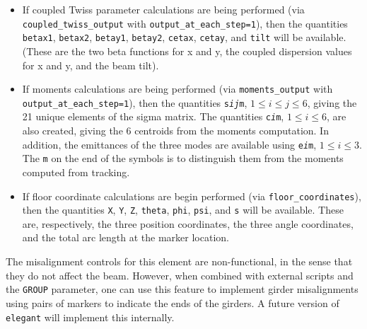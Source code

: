 \begin{itemize}
  {\tt alphax}, {\tt betax}, {\tt nux}, {\tt psix}, {\tt etax}, {\tt etapx}, and {\tt etaxp}, along with similarly-named
  quantities for the vertical plane, will be available, giving twiss parameter values at the marker location.
  Note that {\tt etapx} and {\tt etaxp} are the same, being alternate names for $\eta_x^\prime$.  If radiation integrals are requested,
  the values of the radiation integrals are available in the quantities {\tt I1}, {\tt I2}, etc.
\item If coupled Twiss parameter calculations are being performed (via {\tt coupled\_twiss\_output} with {\tt output\_at\_each\_step=1}),
  then the quantities  \verb|betax1|, \verb|betax2|, \verb|betay1|, \verb|betay2|, \verb|cetax|, \verb|cetay|, and \verb|tilt| will be available.
  (These are the two beta functions for x and y, the coupled dispersion values for x and y, and the beam tilt). 
\item If moments calculations are being performed (via {\tt moments\_output} with  {\tt output\_at\_each\_step=1}), then the quantities 
 {\tt s{\em i}{\em j}m}, $1 \leq i\leq j\leq 6$, giving the 21 unique elements of the sigma matrix.  The quantities {\tt c{\em i}m}, $1\leq i \leq 6$,
 are also created, giving the 6 centroids from the moments computation. In addition, the emittances of the three modes are available using 
 {\tt e{\em i}m}, $1\leq i \leq 3$. The {\tt m} on the end of the symbols is to distinguish them from the moments computed from tracking.
\item If floor coordinate calculations are begin performed (via {\tt floor\_coordinates}), then the quantities
  {\tt X}, {\tt Y}, {\tt Z}, {\tt theta}, {\tt phi}, {\tt psi}, and {\tt s} will be available.  These are,
  respectively, the three position coordinates, the three angle coordinates, and the total arc length
  at the marker location.
\end{itemize}

The misalignment controls for this element are non-functional, in the sense that they do not affect the beam.
However, when combined with external scripts and the \verb|GROUP| parameter, one can use this feature to
implement girder misalignments using pairs of markers to indicate the ends of the girders.  A future version
of {\tt elegant} will implement this internally.
